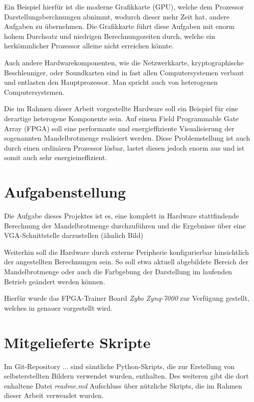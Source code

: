 \documentclass[a4paper,12pt,onesided]{report}
\begin{document}
Ein Beispiel hierfür ist die moderne Grafikkarte (GPU), welche dem Prozessor Darstellungsberchnungen abnimmt, wodurch dieser mehr Zeit hat, andere Aufgaben zu übernehmen. Die Grafikkarte führt diese Aufgaben mit enorm hohem Durchsatz und niedrigen Berechnungszeiten durch, welche ein herkömmlicher Prozessor alleine nicht erreichen könnte.

Auch andere Hardwarekomponenten, wie die Netzwerkkarte, kryptographische Beschleuniger, oder Soundkarten sind in fast allen Computersystemen verbaut und entlasten den Hauptprozessor. Man spricht auch von heterogenen Computersystemen.

Die im Rahmen dieser Arbeit vorgestellte Hardware soll ein Beispiel für eine derartige heterogene Komponente sein. Auf einem Field Programmable Gate Array (FPGA) %
soll eine performante und energieffiziente Visualisierung der sogenannten Mandelbrotmenge realisiert werden. Diese Problemstellung ist auch durch einen ordinären Prozessor lösbar, lastet diesen jedoch enorm aus und ist somit auch sehr energieineffizient. %

\section{Aufgabenstellung}
\label{sec:aufgabenstellung}
Die Aufgabe dieses Projektes ist es, eine komplett in Hardware stattfindende Berechnung der Mandelbrotmenge durchzuführen und die Ergebnisse über eine VGA-Schnittstelle darzustellen (ähnlich Bild) %

Weiterhin soll die Hardware durch externe Peripherie konfigurierbar hinsichtlich der angestellten Berechnungen sein. So soll etwa aktuell abgebildete Bereich der Mandelbrotmenge oder auch die Farbgebung der Darstellung im laufenden Betrieb geändert werden können.

Hierfür wurde das FPGA-Trainer Board \textit{Zybo Zynq-7000} zur Verfügung gestellt, welches in %
genauer vorgestellt wird.

\section{Mitgelieferte Skripte}
Im Git-Repository ... sind sämtliche Python-Skripts, die zur Erstellung von selbsterstellten Bildern verwendet wurden, enthalten. Des weiteren gibt die dort enhaltene Datei \textit{readme.md} Aufschluss über nützliche Skripts, die im Rahmen dieser Arbeit verwendet wurden.
\end{document}
